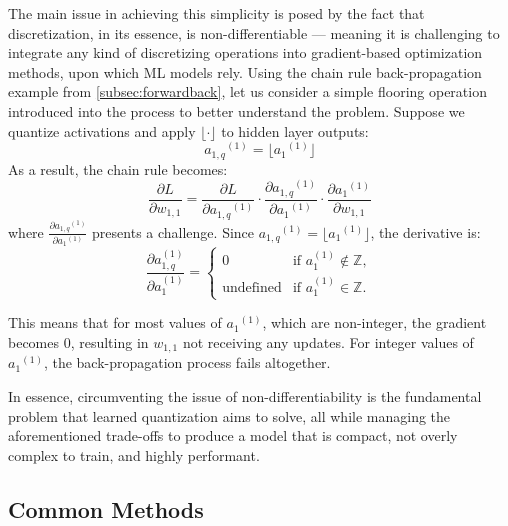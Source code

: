 The main issue in achieving this simplicity is posed by the fact that discretization, in its essence, is non-differentiable
 — meaning it is challenging to integrate any kind of discretizing operations into gradient-based optimization methods, 
 upon which ML models rely. Using the chain rule back-propagation example from \cref{subsec:forwardback}, let us
consider a simple flooring operation introduced into the process to better understand the problem.
Suppose we quantize activations and apply \( \lfloor \cdot \rfloor \) to hidden layer outputs:
\[
  {a_{1,q}}^{(1)} =  \lfloor {a_1}^{(1)} \rfloor
  \]
As a result, the chain rule becomes:
 \[
  \frac{\partial L}{\partial w_{1,1}} =  \frac{\partial L}{\partial {a_{1,q}}^{(1)}} 
  \cdot \frac{\partial {a_{1,q}}^{(1)}}{\partial {a_1}^{(1)}} 
  \cdot \frac{\partial {a_1}^{(1)}}{\partial w_{1,1}}
  \]
where \( \frac{\partial {a_{1,q}}^{(1)}}{\partial {a_1}^{(1)}} \) presents a challenge. 
  Since \(  {a_{1,q}}^{(1)} =  \lfloor {a_1}^{(1)} \rfloor \), the derivative is: 
            \[
            \frac{\partial a_{1,q}^{(1)}}{\partial a_{1}^{(1)}} =
            \begin{cases} 
                0 & \text{if } a_{1}^{(1)} \notin \mathbb{Z}, \\
                \text{undefined} & \text{if } a_{1}^{(1)} \in \mathbb{Z}.
            \end{cases}
            \]

This means that for most values of \( {a_1}^{(1)} \), which are non-integer, the gradient becomes $0$, resulting in 
  $w_{1,1}$ not receiving any updates. For integer values of \( {a_1}^{(1)} \), the back-propagation process fails altogether.

In essence, circumventing the issue of non-differentiability is the fundamental problem that learned quantization aims to solve,
all while managing the aforementioned trade-offs to produce a model that is compact, not overly complex to train,
and highly performant.


\subsection{Common Methods}
\label{subsec:commonlearnedquantizationmethods}

